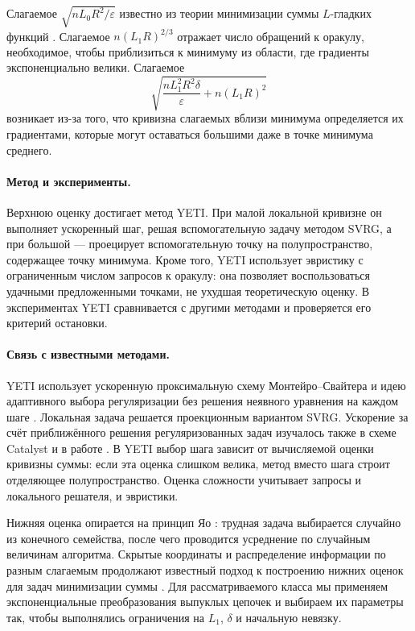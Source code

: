 Слагаемое $\sqrt{nL_0R^2/\varepsilon}$ известно из теории минимизации
суммы $L$-гладких функций \citep{woodworth2016finite}.
Слагаемое $n(L_1R)^{2/3}$ отражает число обращений к оракулу,
необходимое, чтобы приблизиться к минимуму из области, где градиенты
экспоненциально велики. Слагаемое
\[
 \sqrt{\frac{nL_1^2R^2\delta}{\varepsilon}+n(L_1R)^2}
\]
возникает из-за того, что кривизна слагаемых вблизи минимума
определяется их градиентами, которые могут оставаться большими даже в точке
минимума среднего.

\paragraph{Метод и эксперименты.}
Верхнюю оценку достигает метод YETI. При малой локальной кривизне
он выполняет ускоренный шаг, решая вспомогательную задачу методом SVRG,
а при большой --- проецирует вспомогательную точку на полупространство,
содержащее точку минимума. Кроме того, YETI использует эвристику
с ограниченным числом запросов к оракулу: она позволяет воспользоваться
удачными предложенными точками, не ухудшая теоретическую оценку.
В экспериментах YETI сравнивается с другими методами и проверяется
его критерий остановки.

\paragraph{Связь с известными методами.}
YETI использует ускоренную проксимальную схему
Монтейро--Свайтера \citep{ms2013} и идею адаптивного выбора
регуляризации без решения неявного уравнения на каждом шаге
\citep{carmon2022adaptive}. Локальная задача решается
проекционным вариантом SVRG. Ускорение за счёт приближённого решения
регуляризованных задач изучалось также в схеме Catalyst
\citep{lin2015catalyst,lin2018catalyst} и в работе
\citet{frostig2015}. В YETI выбор шага зависит от вычисляемой оценки
кривизны суммы: если эта оценка слишком велика, метод вместо шага строит
отделяющее полупространство. Оценка сложности учитывает запросы
и локального решателя, и эвристики.

Нижняя оценка опирается на принцип Яо \citep{yao1977}: трудная задача
выбирается случайно из конечного семейства, после чего проводится усреднение
по случайным величинам алгоритма. Скрытые координаты и распределение
информации по разным слагаемым продолжают известный подход к построению
нижних оценок для задач минимизации суммы \citep{woodworth2016finite}.
Для рассматриваемого класса мы применяем экспоненциальные
преобразования выпуклых цепочек и выбираем их параметры так,
чтобы выполнялись ограничения на $L_1$, $\delta$ и начальную невязку.

